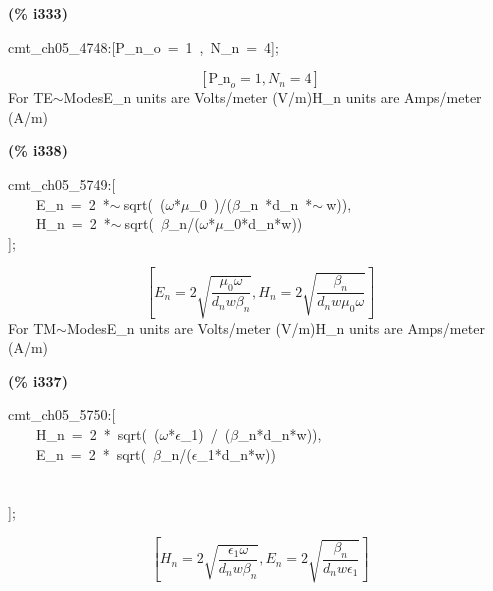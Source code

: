 \documentclass[fleqn]{article}
\begin{document}
\noindent
\begin{minipage}[t]{4.000000em}\color{red}\bfseries
(\% i333)	
\end{minipage}
\begin{minipage}[t]{\textwidth}\color{blue}
cmt\_ch05\_4748:[P\_n\_o\ =\ 1\ ,\ N\_n\ =\ 4];
\end{minipage}
\[\displaystyle \tag{\% o333} 
\left[ {{\ensuremath{\mathrm{P\_ n}}}_o}=1\operatorname{,}{N_n}=4\right] \mbox{}
\]
For TE\ensuremath{\sim }ModesE\_n units are Volts/meter (V/m)H\_n units are Amps/meter (A/m)


\noindent
\begin{minipage}[t]{4.000000em}\color{red}\bfseries
(\% i338)	
\end{minipage}
\begin{minipage}[t]{\textwidth}\color{blue}
cmt\_ch05\_5749:[\\
\ \ \ \ E\_n\ =\ 2\ *\ensuremath{\sim\ }sqrt(\ (\ensuremath{\omega}*\ensuremath{\mu}\_0\ )/(\ensuremath{\beta}\_n\ *d\_n\ *\ensuremath{\sim\ }w)),\\
\ \ \ \ H\_n\ =\ 2\ *\ensuremath{\sim\ }sqrt(\ \ensuremath{\beta}\_n/(\ensuremath{\omega}*\ensuremath{\mu}\_0*d\_n*w))\\
];
\end{minipage}
\[\displaystyle \tag{\% o338} 
\left[ {E_n}=2 \sqrt{\frac{{{\mu }_0} \omega }{{d_n} w {{\beta }_n}}}\operatorname{,}{H_n}=2 \sqrt{\frac{{{\beta }_n}}{{d_n} w {{\mu }_0} \omega }}\right] \mbox{}
\]
For TM\ensuremath{\sim }ModesE\_n units are Volts/meter (V/m)H\_n units are Amps/meter (A/m)


\noindent
\begin{minipage}[t]{4.000000em}\color{red}\bfseries
(\% i337)	
\end{minipage}
\begin{minipage}[t]{\textwidth}\color{blue}
cmt\_ch05\_5750:[\\
\ \ \ \ H\_n\ =\ 2\ *\ sqrt(\ (\ensuremath{\omega}*\ensuremath{\epsilon}\_1)\ /\ (\ensuremath{\beta}\_n*d\_n*w)),\\
\ \ \ \ E\_n\ =\ 2\ *\ sqrt(\ \ensuremath{\beta}\_n/(\ensuremath{\epsilon}\_1*d\_n*w))\\
\\
\\
];
\end{minipage}
\[\displaystyle \tag{\% o337} 
\left[ {H_n}=2 \sqrt{\frac{{{\epsilon }_1} \omega }{{d_n} w {{\beta }_n}}}\operatorname{,}{E_n}=2 \sqrt{\frac{{{\beta }_n}}{{d_n} w {{\epsilon }_1}}}\right] \mbox{}
\]
\end{document}
